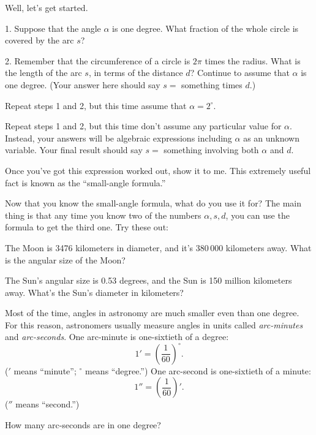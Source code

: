 Well, let's get started.



1. Suppose that the angle $\alpha$ is one degree.  What fraction
of the whole circle is covered by the arc $s$?

\answerspace{1in}

2. Remember that the circumference of a circle is $2\pi$ times the
radius.  What is the length of the arc $s$, in terms of the distance
$d$?  Continue to assume that $\alpha$ is one degree.
(Your answer here should say $s=$ something times $d$.)


\answerspace{1in}


Repeat steps 1 and 2, but this time assume that $\alpha=2^\circ$.


\answerspace{1.5in}

\pagebreak[2]
Repeat steps 1 and 2, but this time don't assume any particular
value for $\alpha$.  Instead, your answers will be algebraic
expressions including $\alpha$ as an unknown variable.
Your final result should say $s=$ something involving both $\alpha$ and $d$.


\answerspace{2in}

Once you've got this expression worked out, show it to me.  This
extremely useful fact is known as the ``small-angle formula.''

Now that you know the small-angle formula, what do you use it for?
The main thing is that any time you know two of the numbers $\alpha,s,d$,
you can use the formula to get the third one.  Try these out:

The Moon is 3476 kilometers in diameter, and it's 380\,000 kilometers
away.  What is the angular size of the Moon?

\answerspace{1in}

The Sun's angular size is 0.53 degrees, and the Sun is 150 million
kilometers away.  What's the Sun's diameter in kilometers?

\answerspace{1in}

\pagebreak[3]
Most of the time, angles in astronomy are much smaller even than one degree.
For this reason, astronomers usually measure angles in units called
{\it arc-minutes} and {\it arc-seconds}.  One arc-minute is one-sixtieth
of a degree:
$$
1' = \left(\frac{1}{60}\right)^\circ.
$$
($'$ means ``minute''; $^\circ$ means ``degree.'')
One arc-second is one-sixtieth of a minute:
$$
1''=\left(\frac{1}{60}\right)'.
$$
($''$ means ``second.'')

How many arc-seconds are in one degree?

